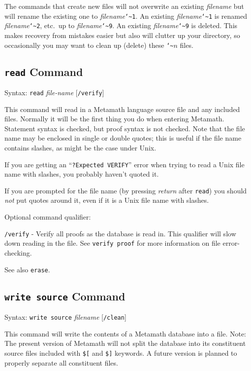 The commands that create new files will not overwrite an existing {\em
filename} but will rename the existing one to {\em
filename}\texttt{{\char`\~}1}.  An existing {\em
filename}\texttt{{\char`\~}1} is renamed {\em
filename}\texttt{{\char`\~}2}, etc.\ up to {\em
filename}\texttt{{\char`\~}9}.  An existing {\em
filename}\texttt{{\char`\~}9} is deleted.  This makes recovery from
mistakes easier but also will clutter up your directory, so occasionally
you may want to clean up (delete) these \texttt{{\char`\~}}$n$ files.


\subsection{\texttt{read} Command}
Syntax:  \texttt{read} {\em file-name} [\texttt{/verify}]

This command will read in a Metamath language source file and any included
files.  Normally it will be the first thing you do when entering Metamath.
Statement syntax is checked, but proof syntax is not checked.
Note that the file name may be enclosed in single or double quotes;
this is useful if the file name contains slashes, as might be the case
under Unix.

If you are getting an ``\texttt{?Expected VERIFY}'' error
when trying to read a Unix file name with slashes, you probably haven't
quoted it.

If you are prompted for the file name (by pressing {\em return}
 after \texttt{read})
you should {\em not} put quotes around it, even if it is a Unix file name
with slashes.

Optional command qualifier:

    \texttt{/verify} - Verify all proofs as the database is read in.  This
         qualifier will slow down reading in the file.  See \texttt{verify
         proof} for more information on file error-checking.

See also \texttt{erase}.



\subsection{\texttt{write source} Command}
Syntax:  \texttt{write source} {\em filename} [\texttt{/clean}]

This command will write the contents of a Metamath
database into a file. Note:  The present version of
Metamath will not
split the database into its constituent source files included with
\texttt{\$[} and
\texttt{\$]} keywords.  A future version is planned to properly separate
all constituent files.

